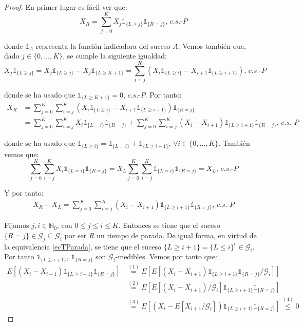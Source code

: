 \begin{proof}
En primer lugar es fácil ver que:
$$X_R = \sum_{j=0}^{K}X_j\mathds{1}_{\{L\geq j\}}\mathds{1}_{\{R=j\}} \text{, }c.s.\text{-}P$$

donde $\mathds{1}_{A}$ representa la función indicadora del suceso $A$. Vemos también que, dado $j\in \{0,\ldots ,K\}$, se cumple la siguiente igualdad:
$$ X_j\mathds{1}_{\{L\geq j\}} = X_j\mathds{1}_{\{L\geq j\}} - X_j\mathds{1}_{\{L\geq K+1\}} = \sum_{i=j}^{K} (X_i \mathds{1}_{\{L\geq i\}} - X_{i+1}\mathds{1}_{\{L\geq i+1\}}) \text{, }c.s.\text{-}P$$

donde se ha usado que $\mathds{1}_{\{L\geq K+1\}} = 0  \text{, }c.s.\text{-}P$. Por tanto:
\begin{align*}
X_R &= \sum_{j=0}^{K} \sum_{i=j}^{K} (X_i \mathds{1}_{\{L\geq i\}} - X_{i+1}\mathds{1}_{\{L\geq i+1\}}) \mathds{1}_{\{R=j\}}\\
&= \sum_{j=0}^{K} \sum_{i=j}^{K} X_i \mathds{1}_{\{L=i\}}\mathds{1}_{\{R=j\}} + \sum_{j=0}^{K} \sum_{i=j}^{K} (X_i - X_{i+1}) \mathds{1}_{\{L\geq i+1\}} \mathds{1}_{\{R=j\}}  \text{, }c.s.\text{-}P
\end{align*}

donde se ha usado que $\mathds{1}_{\{L\geq i\}} = \mathds{1}_{\{L = i\}} + \mathds{1}_{\{L\geq i+1\}}  \text{, }\forall i\in \{0,\ldots ,K\}$. También vemos que:
$$\sum_{j=0}^{K} \sum_{i=j}^{K} X_i \mathds{1}_{\{L=i\}}\mathds{1}_{\{R=j\}} = X_L \sum_{j=0}^{K} \sum_{i=j}^{K} \mathds{1}_{\{L=i\}}\mathds{1}_{\{R=j\}} = X_L  \text{, }c.s.\text{-}P$$

Y por tanto:
\begin{gather}\tag{$*_1$}\label{aux}
X_R-X_L = \sum_{j=0}^{K} \sum_{i=j}^{K} (X_i - X_{i+1}) \mathds{1}_{\{L\geq i+1\}} \mathds{1}_{\{R=j\}}  \text{, }c.s.\text{-}P
\end{gather}

Fijamos $j,i\in\mathds{N}_0$, con $0\leq j\leq i \leq K$. Entonces se tiene que el suceso $\{R=j\}\in \mathscr{G}_j\subseteq \mathscr{G}_i$ por ser $R$ un tiempo de parada. De igual forma, en virtud de la equivalencia \ref{ecTParada}, se tiene que el suceso $\{L\geq i+1\} = \{L\leq i\}^c \in \mathscr{G}_i$. Por tanto $\mathds{1}_{\{L\geq i+1\}}$, $\mathds{1}_{\{R=j\}}$ son $\mathscr{G}_i$-medibles. Vemos por tanto que:
\begin{align*}
E[(X_i - X_{i+1}) \mathds{1}_{\{L\geq i+1\}} \mathds{1}_{\{R=j\}}] &\overset{(1)}{=} E[E[(X_i - X_{i+1}) \mathds{1}_{\{L\geq i+1\}} \mathds{1}_{\{R=j\}}/\mathscr{G}_i]] \\
&\overset{(2)}{=} E[E[(X_i - X_{i+1})/\mathscr{G}_i]\mathds{1}_{\{L\geq i+1\}} \mathds{1}_{\{R=j\}}]\\
&\overset{(3)}{=} E[(X_i-E[X_{i+1}/\mathscr{G}_i])\mathds{1}_{\{L\geq i+1\}} \mathds{1}_{\{R=j\}}] \overset{(4)}{\leq} 0 
\end{align*}


\end{proof}
